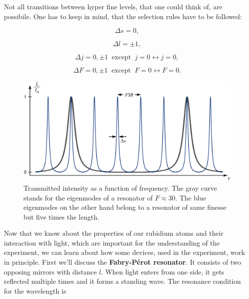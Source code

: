 Not all transitions between hyper fine levels, that one could think of, are possibile. One has to keep in mind, that the selection rules have to be followed:

\begin{equation}
\label{E:Deltas}
\Delta s=0,
\end{equation}

\begin{equation}
\label{E:Deltal}
\Delta l=\pm1,
\end{equation}

\begin{equation}
\label{E:Deltaj}
\Delta j=0,\pm1 \;\; \text{except} \;\; j=0\leftrightarrow j=0,
\end{equation}

\begin{equation}
\label{E:DeltaF}
\Delta F=0,\pm1 \;\; \text{except} \;\; F=0\leftrightarrow F=0.
\end{equation}

\begin{figure}[h]
    \centering
    \includegraphics[width=13cm]{Intres.png}
    \caption{Transmitted intensity as a function of frequency. The gray curve stands for the eigenmodes of a resonator of $F\approx30$. The blue eigenmodes on the other hand belong to a resonator of same finesse but five times the length.}
    \label{fig:Intres.}
\end{figure}

Now that we know about the properties of our rubidium atoms and their interaction with light, which are important for the understanding of the experiment, we can learn about how some devices, used in the experiment, work in principle. First we'll discuss the \textbf{Fabry-Pérot resonator}. It consists of two opposing mirrors with distance $l$. When light enters from one side, it gets reflected multiple times and it forms a standing wave. The resonance condition for the wavelength is

